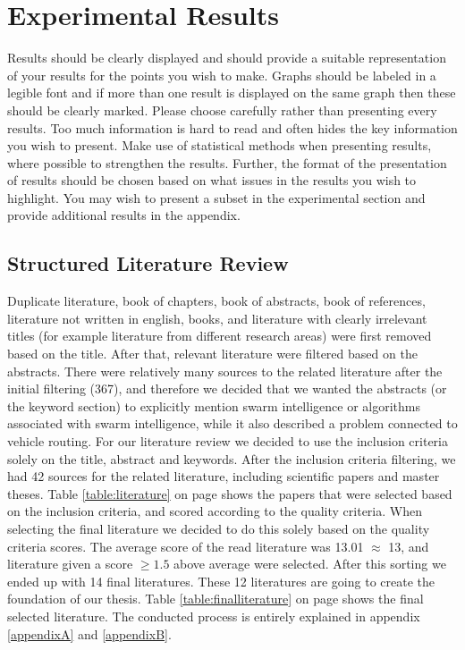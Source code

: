 \section{Experimental Results}

Results should be clearly displayed and should provide a suitable representation of your results for the points you wish to make. Graphs should be labeled in a legible font and if more than one result is displayed on the same graph then these should be clearly marked.   Please choose carefully rather than presenting every results. Too much information is hard to read and often hides the key information you wish to present. Make use of statistical methods when presenting results, where possible to strengthen the results.  Further, the format of the presentation of results should be chosen based on what issues in the results you wish to highlight. You may wish to present a subset in the experimental section and provide additional results in the appendix.

\subsection{Structured Literature Review}
Duplicate literature, book of chapters, book of abstracts, book of references, literature not written in english, books, and literature with clearly irrelevant titles (for example literature from different research areas) were first removed based on the title. After that, relevant literature were filtered based on the abstracts. There were relatively many sources to the related literature after the initial filtering (367), and therefore we decided that we wanted the abstracts (or the keyword section) to explicitly mention swarm intelligence or algorithms associated with swarm intelligence, while it also described a problem connected to vehicle routing. For our literature review we decided to use the inclusion criteria solely on the title, abstract and keywords. After the inclusion criteria filtering, we had 42 sources for the related literature, including scientific papers and master theses. Table \ref{table:literature} on page \pageref{table:literature} shows the papers that were selected based on the inclusion criteria, and scored according to the quality criteria. When selecting the final literature we decided to do this solely based on the quality criteria scores. The average score of the read literature was 13.01 $\approx$ 13, and literature given a score $\geq{1.5}$ above average were selected. After this sorting we ended up with 14 final literatures. These 12 literatures are going to create the foundation of our thesis. Table \ref{table:finalliterature} on page \pageref{table:finalliterature} shows the final selected literature. The conducted process is entirely explained in appendix \ref{appendixA} and \ref{appendixB}.

